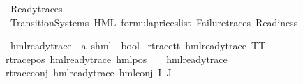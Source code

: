 %
\begin{isabellebody}%
%
%
\isadelimtheory
%
\endisadelimtheory
%
\isatagtheory
{}\isamarkupfalse%
\ Ready{\isacharunderscore}{\kern0pt}traces\isanewline
{}\ Transition{\isacharunderscore}{\kern0pt}Systems\ HML\ formula{\isacharunderscore}{\kern0pt}prices{\isacharunderscore}{\kern0pt}list\ Failure{\isacharunderscore}{\kern0pt}traces\ Readiness\isanewline
{}%
\endisatagtheory
{\isafoldtheory}%
%
\isadelimtheory
%
\endisadelimtheory
%
\isadelimdocument
%
\endisadelimdocument
%
\isatagdocument
%
\isamarkuptrue%
%
\endisatagdocument
{\isafolddocument}%
%
\isadelimdocument
%
\endisadelimdocument
%
\begin{isamarkuptext}%
%
\end{isamarkuptext}\isamarkuptrue%
\isamarkupfalse%
\ hml{\isacharunderscore}{\kern0pt}ready{\isacharunderscore}{\kern0pt}trace\ {\isacharcolon}{\kern0pt}{\isacharcolon}{\kern0pt}\ {\isachardoublequoteopen}{\isacharparenleft}{\kern0pt}{\isacharprime}{\kern0pt}a{\isacharcomma}{\kern0pt}\ {\isacharprime}{\kern0pt}s{\isacharparenright}{\kern0pt}hml\ {\isasymRightarrow}\ bool{\isachardoublequoteclose}\ \isanewline
r{\isacharunderscore}{\kern0pt}trace{\isacharunderscore}{\kern0pt}tt{\isacharcolon}{\kern0pt}\ {\isachardoublequoteopen}hml{\isacharunderscore}{\kern0pt}ready{\isacharunderscore}{\kern0pt}trace\ TT{\isachardoublequoteclose}\ {\isacharbar}{\kern0pt}\isanewline
r{\isacharunderscore}{\kern0pt}trace{\isacharunderscore}{\kern0pt}pos{\isacharcolon}{\kern0pt}\ {\isachardoublequoteopen}hml{\isacharunderscore}{\kern0pt}ready{\isacharunderscore}{\kern0pt}trace\ {\isacharparenleft}{\kern0pt}hml{\isacharunderscore}{\kern0pt}pos\ {\isasymalpha}\ {\isasymphi}{\isacharparenright}{\kern0pt}{\isachardoublequoteclose}\ \ {\isachardoublequoteopen}hml{\isacharunderscore}{\kern0pt}ready{\isacharunderscore}{\kern0pt}trace\ {\isasymphi}{\isachardoublequoteclose}\ {\isacharbar}{\kern0pt}\isanewline
r{\isacharunderscore}{\kern0pt}trace{\isacharunderscore}{\kern0pt}conj{\isacharcolon}{\kern0pt}\ {\isachardoublequoteopen}hml{\isacharunderscore}{\kern0pt}ready{\isacharunderscore}{\kern0pt}trace\ {\isacharparenleft}{\kern0pt}hml{\isacharunderscore}{\kern0pt}conj\ I\ J\ {\isasymPhi}{\isacharparenright}{\kern0pt}{\isachardoublequoteclose}\ \isanewline

\end{isabellebody}

